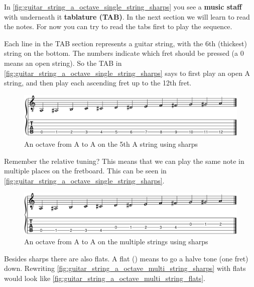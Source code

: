 In \autoref{fig:guitar_string_a_octave_single_string_sharps} you see a \textbf{music staff} with underneath it \textbf{tablature (TAB)}. In the next section we will learn to read the notes. For now you can try to read the tabs first to play the sequence.

Each line in the TAB section represents a guitar string, with the 6th (thickest) string on the bottom. The numbers indicate which fret should be pressed (a 0 means an open string). So the TAB in \autoref{fig:guitar_string_a_octave_single_string_sharps} says to first play an open A string, and then play each ascending fret up to the 12th fret.

\begin{figure}[h]
    \centering
    \includegraphics[width=\textwidth]{../../MuseScore/Guitar/PitchesSharpsSingleString.png}
    \caption{An octave from A to A on the 5th A string using sharps}
    \label{fig:guitar_string_a_octave_single_string_sharps}
\end{figure}

\newpage

Remember the relative tuning? This means that we can play the same note in multiple places on the fretboard. This can be seen in \autoref{fig:guitar_string_a_octave_single_string_sharps}.

\begin{figure}[h]
	\centering
	\includegraphics[width=\textwidth]{../../MuseScore/Guitar/PitchesSharpsMultiString.png}
	\caption{An octave from A to A on the multiple strings using sharps}
	\label{fig:guitar_string_a_octave_multi_string_sharps}
\end{figure}

Besides sharps there are also flats. A flat (\flat) means to go a halve tone (one fret) down. Rewriting \autoref{fig:guitar_string_a_octave_multi_string_sharps} with flats would look like \autoref{fig:guitar_string_a_octave_multi_string_flats}.

